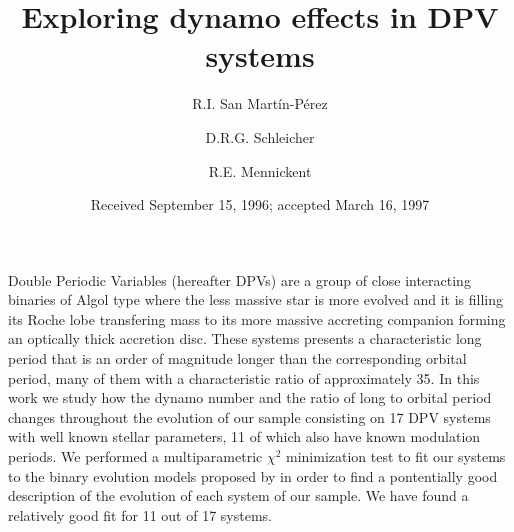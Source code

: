\documentclass{aa}
\begin{document}
\title{Exploring dynamo effects in DPV systems}
   \author{R.I. San Mart\'in-P\'erez
          \and
          D.R.G. Schleicher
          \and
          R.E. Mennickent
          }


   \date{Received September 15, 1996; accepted March 16, 1997}

  \abstract
   {Double Periodic Variables (hereafter DPVs) are a group of close interacting binaries of Algol type where the less massive star is more evolved and it is filling its Roche lobe transfering mass to its more massive accreting companion forming an optically thick accretion disc. These systems presents a characteristic long period that is an order of magnitude longer than the corresponding orbital period, many of them with a characteristic ratio of approximately 35.}
   {In this work we study how the dynamo number and the ratio of long to orbital period changes throughout the evolution of our sample consisting on 17 DPV systems with well known stellar parameters, 11 of which also have known modulation periods.}
   {We performed a multiparametric $\chi^{2}$ minimization test to fit our systems to the binary evolution models proposed by \citet{vanrensbergen2008} in order to find a pontentially good description of the evolution of each system of our sample.}
   {We have found a relatively good fit for 11  out of 17 systems.}
   {}


\maketitle


\begin{acknowledgement}
\end{acknowledgement}


\end{document}
